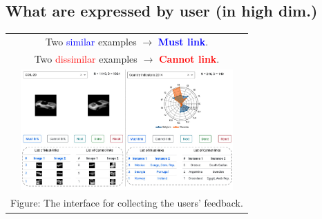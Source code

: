 \documentclass[portrait,final,a0paper]{nadiposter}
\begin{document}
\begin{poster}
{\begin{multicols}{2}
    \section*{\large{What are expressed by user (in high dim.)}}
    \begin{center}
    \begin{tabular}{c}
        Two \textcolor{blue}{similar} examples $\rightarrow$ \textcolor{blue}{\textbf{Must link}}.\\
        Two \textcolor{red}{dissimilar} examples $\rightarrow$ \textcolor{red}{\textbf{Cannot link}}. \\
        \includegraphics[height=12.5em]{poster_NADI_2018/images/app_guis_no_annotations.pdf}\\
        \tiny{Figure: The interface for collecting the users' feedback.}
    \end{tabular}
    \end{center}

\end{multicols}}
\end{poster}
\end{document}
